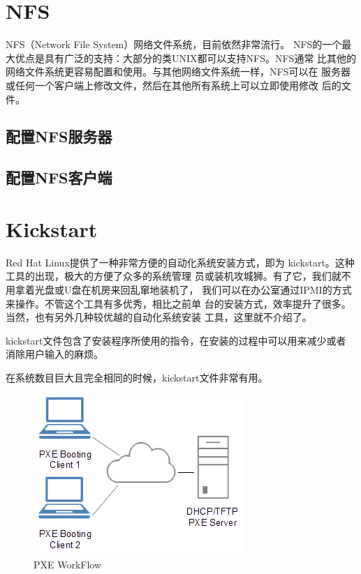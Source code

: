 \chapter{NFS}

NFS（Network File System）网络文件系统，目前依然非常流行。
NFS的一个最大优点是具有广泛的支持：大部分的类UNIX都可以支持NFS。NFS通常
比其他的网络文件系统更容易配置和使用。与其他网络文件系统一样，NFS可以在
服务器或任何一个客户端上修改文件，然后在其他所有系统上可以立即使用修改
后的文件。

\section{配置NFS服务器}

\section{配置NFS客户端}

\chapter{Kickstart}

Red Hat Linux提供了一种非常方便的自动化系统安装方式，即为
kickstart。这种工具的出现，极大的方便了众多的系统管理
员或装机攻城狮。有了它，我们就不用拿着光盘或U盘在机房来回乱窜地装机了，
我们可以在办公室通过IPMI的方式来操作。不管这个工具有多优秀，相比之前单
台的安装方式，效率提升了很多。当然，也有另外几种较优越的自动化系统安装
工具，这里就不介绍了。

kickstart文件包含了安装程序所使用的指令，在安装的过程中可以用来减少或者
消除用户输入的麻烦。

在系统数目巨大且完全相同的时候，kickstart文件非常有用。


\begin{figure}[htbp]
  \begin{center}
    \includegraphics[width=.5\textwidth]{graph/PXE_diagram.png}
  \end{center}
  \caption{PXE WorkFlow}
  \label{fig:pxeWork}
\end{figure}

